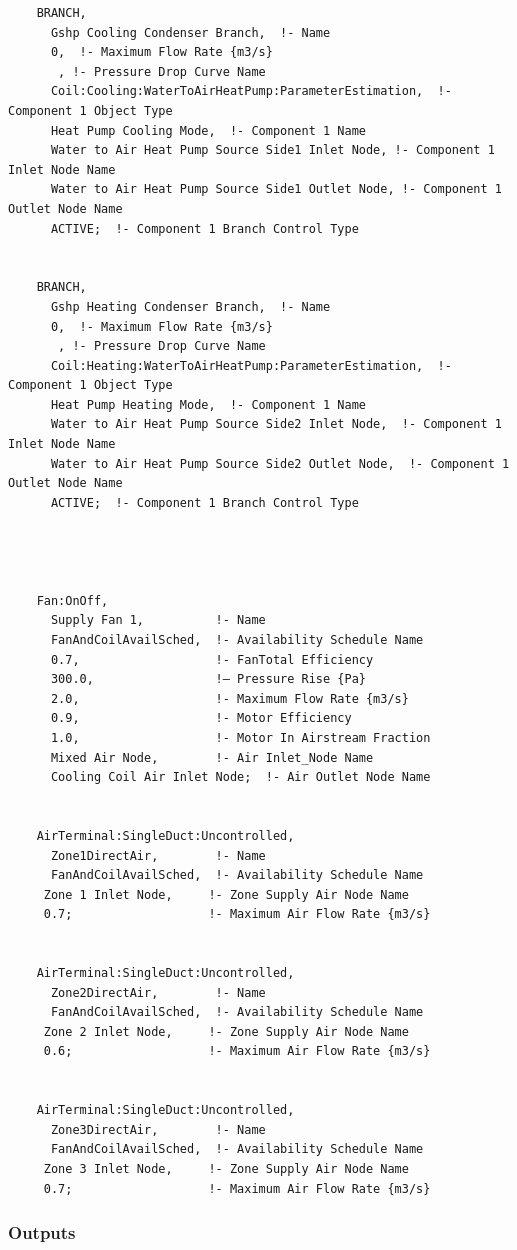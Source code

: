 \begin{lstlisting}
    BRANCH,
      Gshp Cooling Condenser Branch,  !- Name
      0,  !- Maximum Flow Rate {m3/s}
       , !- Pressure Drop Curve Name
      Coil:Cooling:WaterToAirHeatPump:ParameterEstimation,  !- Component 1 Object Type
      Heat Pump Cooling Mode,  !- Component 1 Name
      Water to Air Heat Pump Source Side1 Inlet Node, !- Component 1 Inlet Node Name
      Water to Air Heat Pump Source Side1 Outlet Node, !- Component 1 Outlet Node Name
      ACTIVE;  !- Component 1 Branch Control Type


    BRANCH,
      Gshp Heating Condenser Branch,  !- Name
      0,  !- Maximum Flow Rate {m3/s}
       , !- Pressure Drop Curve Name
      Coil:Heating:WaterToAirHeatPump:ParameterEstimation,  !- Component 1 Object Type
      Heat Pump Heating Mode,  !- Component 1 Name
      Water to Air Heat Pump Source Side2 Inlet Node,  !- Component 1 Inlet Node Name
      Water to Air Heat Pump Source Side2 Outlet Node,  !- Component 1 Outlet Node Name
      ACTIVE;  !- Component 1 Branch Control Type




    Fan:OnOff,
      Supply Fan 1,          !- Name
      FanAndCoilAvailSched,  !- Availability Schedule Name
      0.7,                   !- FanTotal Efficiency
      300.0,                 !– Pressure Rise {Pa}
      2.0,                   !- Maximum Flow Rate {m3/s}
      0.9,                   !- Motor Efficiency
      1.0,                   !- Motor In Airstream Fraction
      Mixed Air Node,        !- Air Inlet_Node Name
      Cooling Coil Air Inlet Node;  !- Air Outlet Node Name


    AirTerminal:SingleDuct:Uncontrolled,
      Zone1DirectAir,        !- Name
      FanAndCoilAvailSched,  !- Availability Schedule Name
     Zone 1 Inlet Node,     !- Zone Supply Air Node Name
     0.7;                   !- Maximum Air Flow Rate {m3/s}


    AirTerminal:SingleDuct:Uncontrolled,
      Zone2DirectAir,        !- Name
      FanAndCoilAvailSched,  !- Availability Schedule Name
     Zone 2 Inlet Node,     !- Zone Supply Air Node Name
     0.6;                   !- Maximum Air Flow Rate {m3/s}


    AirTerminal:SingleDuct:Uncontrolled,
      Zone3DirectAir,        !- Name
      FanAndCoilAvailSched,  !- Availability Schedule Name
     Zone 3 Inlet Node,     !- Zone Supply Air Node Name
     0.7;                   !- Maximum Air Flow Rate {m3/s}
\end{lstlisting}

\subsubsection{Outputs}\label{outputs-6-011}

